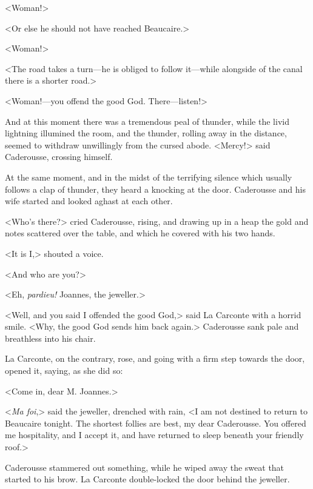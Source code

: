 {<Woman!> 

 <Or else he should not have reached Beaucaire.> 

<Woman!> 

<The road takes a turn—he is obliged to follow it—while alongside of the canal there is a shorter road.> 

<Woman!—you offend the good God. There—listen!> 

 And at this moment there was a tremendous peal of thunder, while the livid lightning illumined the room, and the thunder, rolling away in the distance, seemed to withdraw unwillingly from the cursed abode. <Mercy!> said Caderousse, crossing himself.  
 
 At the same moment, and in the midst of the terrifying silence which usually follows a clap of thunder, they heard a knocking at the door. Caderousse and his wife started and looked aghast at each other. 

<Who's there?> cried Caderousse, rising, and drawing up in a heap the gold and notes scattered over the table, and which he covered with his two hands. 

<It is I,> shouted a voice. 

<And who are you?> 

<Eh, \textit{pardieu!} Joannes, the jeweller.> 

 <Well, and you said I offended the good God,> said La Carconte with a horrid smile. <Why, the good God sends him back again.> Caderousse sank pale and breathless into his chair. 

La Carconte, on the contrary, rose, and going with a firm step towards the door, opened it, saying, as she did so: 

<Come in, dear M. Joannes.> 

<\textit{Ma foi},> said the jeweller, drenched with rain, <I am not destined to return to Beaucaire tonight. The shortest follies are best, my dear Caderousse. You offered me hospitality, and I accept it, and have returned to sleep beneath your friendly roof.> 

Caderousse stammered out something, while he wiped away the sweat that started to his brow. La Carconte double-locked the door behind the jeweller.}